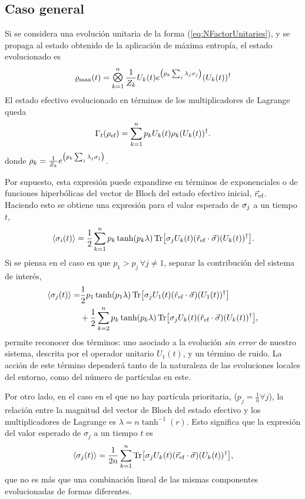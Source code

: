\subsection{Caso general}

Si se considera una evolución unitaria de la forma (\ref{eq:NFactorUnitaries}), y se propaga al estado obtenido de la aplicación de máxima entropía, el estado evolucionado es
\begin{equation}
    \varrho_{\max}(t)=\Motimes_{k=1}^{n}\frac{1}{Z_{k}}U_{k}(t) e^{\qty(p_{k}\sum_{j}\lambda_{j}\pauli{j})} (U_{k}(t))^{\dag}\nonumber
\end{equation}
El estado efectivo evolucionado en términos de los multiplicadores de Lagrange queda
\begin{equation}\label{eq:SeparableEvolution}
    \Gamma_{t}(\rho_{\text{ef}})=\sum_{k=1}^{n}p_{k} U_{k}(t) \rho_{k} (U_{k}(t))^{\dag}.
\end{equation}
donde $\rho_{k}=\frac{1}{Z_{k}}e^{\qty(p_{k}\sum_{j}\lambda_{j}\sigma_{j})}$. 

Por supuesto, esta expresión puede expandirse en términos de exponenciales o de funciones hiperbólicas del vector de Bloch del estado efectivo inicial, $\vec{r}_{\text{ef}}$. Haciendo esto se obtiene una expresión para el valor esperado de $\sigma_{j}$ a un tiempo $t$,
\begin{equation}\label{eq:SeparableEvolutionExpVal}
    \expval{\sigma_{i}(t)}=\frac{1}{2}\sum_{k=1}^{n}p_{k}\tanh(p_{k}\lambda)\Tr[\sigma_{j}U_{k}(t) (\hat{r}_{\text{ef}}\cdot\vec{\sigma}) (U_{k}(t))^{\dag}].
\end{equation}
Si se piensa en el caso en que $p_{1}>p_{j}\,\forall j\neq 1$, separar la contribución del sistema de interés,
\begin{align}
    \expval{\sigma_{j}(t)}=&\frac{1}{2}p_{1}\tanh(p_{1}\lambda)\Tr[\sigma_{j}U_{1}(t) (\hat{r}_{\text{ef}}\cdot\vec{\sigma}) (U_{1}(t))^{\dag}]\nonumber\\
    &+\frac{1}{2}\sum_{k=2}^{n}p_{k}\tanh(p_{k}\lambda)\Tr[\sigma_{j}U_{k}(t) (\hat{r}_{\text{ef}}\cdot\vec{\sigma}) (U_{k}(t))^{\dag}]\nonumber,
\end{align}
permite reconocer dos términos: uno asociado a la evolución \textit{sin error} de nuestro sistema, descrita por el operador unitario $U_{1}(t)$, y un término de ruido. La acción de este término dependerá tanto de la naturaleza de las evoluciones locales del entorno, como del número de partículas en este.


Por otro lado, en el caso en el que no hay partícula prioritaria, \ie ($p_{j}=\frac{1}{n}\forall j$), la relación entre la magnitud del vector de Bloch del estado efectivo y los multiplicadores de Lagrange es $\lambda=n\tanh^{-1}(r)$. Esto significa que la expresión del valor esperado de $\sigma_{j}$ a un tiempo $t$ es
\begin{equation}
    \expval{\sigma_{j}(t)}=\frac{1}{2n}\sum_{k=1}^{n}\Tr[\sigma_{j}U_{k}(t) (\vec{r}_{\text{ef}}\cdot\vec{\sigma}) (U_{k}(t))^{\dag}],\nonumber
\end{equation}
que no es más que una combinación lineal de las mismas componentes evolucionadas de formas diferentes.

